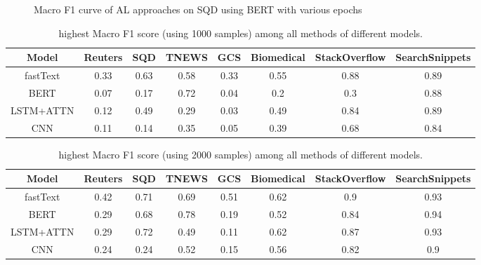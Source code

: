 \begin{enumerate}
\begin{figure}[th!]%

	\noindent
	\begin{center}
	\end{center}
	\caption{Macro F1 curve of AL approaches on SQD using BERT with various epochs}
	\label{fig:bert_5_epoch}
\end{figure}

\begin{table}[th]
	\scriptsize
	\centering
	\begin{tabular}{cccccccc}
		\toprule
		Model & Reuters    & SQD   & TNEWS   & GCS& Biomedical & StackOverflow & SearchSnippets\\ \hline
		fastText & 0.33 & 0.63 & 0.58 & 0.33 & 0.55 & 0.88 & 0.89\\
		BERT & 0.07 & 0.17 & 0.72 & 0.04 & 0.2 & 0.3 & 0.88\\
		LSTM+ATTN & 0.12 & 0.49 & 0.29 & 0.03 & 0.49 & 0.84 & 0.89\\
		CNN & 0.11 & 0.14 & 0.35 & 0.05 & 0.39 & 0.68 & 0.84\\
		\bottomrule
	\end{tabular}
	\caption{highest Macro F1 score (using 1000 samples) among all methods of different models.}
	\label{table:upperbound_1000}
\end{table}

\begin{table}[th]
	\scriptsize
	\centering
	\begin{tabular}{cccccccc}
		\toprule
		Model & Reuters    & SQD   & TNEWS   & GCS& Biomedical & StackOverflow & SearchSnippets\\ \hline
		fastText & 0.42 & 0.71 & 0.69 & 0.51 & 0.62 & 0.9 & 0.93\\
		BERT & 0.29 & 0.68 & 0.78 & 0.19 & 0.52 & 0.84 & 0.94\\
		LSTM+ATTN & 0.29 & 0.72 & 0.49 & 0.11 & 0.62 & 0.87 & 0.93\\
		CNN & 0.24 & 0.24 & 0.52 & 0.15 & 0.56 & 0.82 & 0.9\\
		\bottomrule
	\end{tabular}
	\caption{highest Macro F1 score (using 2000 samples) among all methods of different models.}
	\label{table:upperbound_2000}
\end{table}


\end{enumerate}
